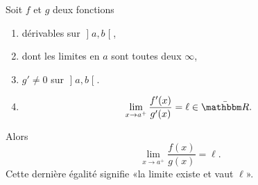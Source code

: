 \begin{proposition}      \label{PROPooTJVCooMeUhIy}
    Soit \( f\) et \( g\) deux fonctions
    \begin{enumerate}
        \item
            dérivables sur \( \mathopen] a , b \mathclose[\),
        \item
                dont les limites en \( a\) sont toutes deux \( \infty\),
            \item
            \( g'\neq 0\) sur \( \mathopen] a , b \mathclose[\).
        \item
            \begin{equation}        \label{EQooVFYCooMjOGtI}
                \lim_{x\to a^+} \frac{ f'(x) }{ g'(x) }=\ell\in \bar \eR.
            \end{equation}
    \end{enumerate}
    Alors
    \begin{equation}
        \lim_{x\to a^+} \frac{ f(x) }{ g(x) }=\ell.
    \end{equation}
    Cette dernière égalité signifie «la limite existe et vaut \( \ell\)».
\end{proposition}

